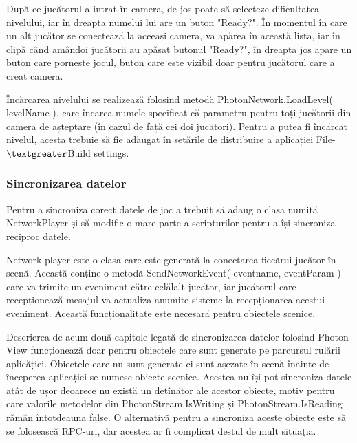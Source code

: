 \documentclass[12pt, a4paper]{article}
\begin{document}
	După ce jucătorul a intrat în camera, de jos poate să selecteze dificultatea nivelului, iar în dreapta numelui lui are un buton "Ready?". În momentul în care un alt jucător se conectează la aceeași camera, va apărea în această lista, iar în clipă când amândoi jucătorii au apăsat butonul "Ready?", în dreapta jos apare un buton care pornește jocul, buton care este vizibil doar pentru jucătorul care a creat camera.
	\newline
	
	Încărcarea nivelului se realizează folosind metodă PhotonNetwork.LoadLevel( levelName ), care încarcă numele specificat că parametru pentru toți jucătorii din camera de așteptare (în cazul de față cei doi jucători). Pentru a putea fi încărcat nivelul, acesta trebuie să fie adăugat în setările de distribuire a aplicației File-$\textgreater$Build settings.
	
	
	
	
	
	\subsubsection{Sincronizarea datelor}
	\label{section: dataSync}
	
	Pentru a sincroniza corect datele de joc a trebuit să adaug o clasa numită NetworkPlayer și să modific o mare parte a scripturilor pentru a își sincroniza reciproc datele.
	\newline
	
	Network player este o clasa care este generată la conectarea fiecărui jucător în scenă. Această conține o metodă SendNetworkEvent( eventname, eventParam ) care va trimite un eveniment către celălalt jucător, iar jucătorul care recepționează mesajul va actualiza anumite sisteme la recepționarea acestui eveniment. Această funcționalitate este necesară pentru obiectele scenice.
	\newline
	
	Descrierea de acum două capitole legată de sincronizarea datelor folosind Photon View funcționează doar pentru obiectele care sunt generate pe parcursul rulării aplicăției. Obiectele care nu sunt generate ci sunt așezate în scenă înainte de începerea aplicației se numesc obiecte scenice. Acestea nu își pot sincroniza datele atât de ușor deoarece nu există un dețînător ale acestor obiecte, motiv pentru care valorile metodelor din PhotonStream.IsWriting și PhotonStream.IsReading rămân întotdeauna false. O alternativă pentru a sincroniza aceste obiecte este să se folosească RPC-uri, dar acestea ar fi complicat destul de mult situația.
	\newline
	
\end{document}
